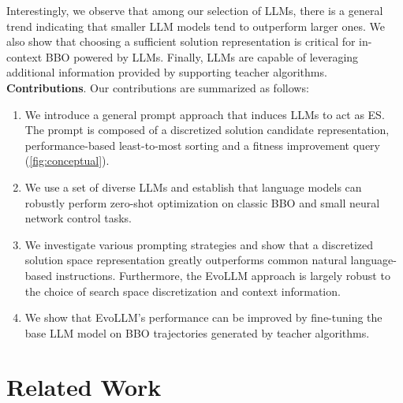Interestingly, we observe that among our selection of LLMs, there is a general trend indicating that smaller LLM models tend to outperform larger ones.
We also show that choosing a sufficient solution representation is critical for in-context BBO powered by LLMs. 
Finally, LLMs are capable of leveraging additional information provided by supporting teacher algorithms.\\
%
\textbf{Contributions}. Our contributions are summarized as follows:

\begin{enumerate}
\item We introduce a general prompt approach that induces LLMs to act as ES. The prompt is composed of a discretized solution candidate representation, performance-based least-to-most sorting and a fitness improvement query (\cref{fig:conceptual}).
\item We use a set of diverse LLMs and establish that language models can robustly perform zero-shot optimization on classic BBO and small neural network control tasks.
\item We investigate various prompting strategies and show that a discretized solution space representation greatly outperforms common natural language-based instructions. Furthermore, the EvoLLM approach is largely robust to the choice of search space discretization and context information.
\item We show that EvoLLM's performance can be improved by fine-tuning the base LLM model on BBO trajectories generated by teacher algorithms.
\end{enumerate}

\section{Related Work}

